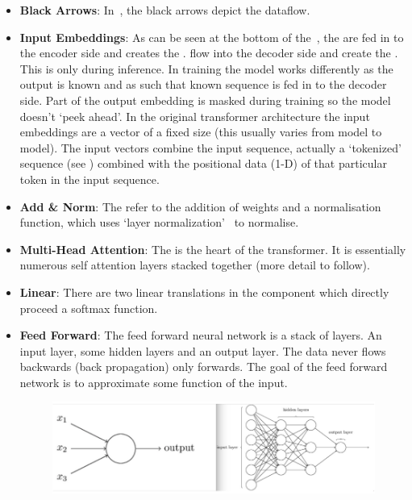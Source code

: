 \begin{itemize}
	\item \textbf{Black Arrows}: In~, the black arrows depict the dataflow.
	\item \textbf{Input Embeddings}: As can be seen at the bottom of the~, the  are fed in to the encoder side and creates the
	      .  flow into the decoder side and create the . This is only during inference. In training
	      the model works differently as the output is known and as such that known sequence is fed in to the decoder side. Part of the output embedding
	      is masked during training so the model doesn't `peek ahead'.
	      \bigbreak
	      In the original transformer architecture the input embeddings are a vector of a fixed size (this usually varies from model to model).
	      The input vectors combine the input sequence, actually a `tokenized' sequence (see ) combined with the positional data
	      (1-D) of that particular token in the input sequence.
	\item \textbf{Add \& Norm}: The  refer to the addition of weights and a normalisation function, which uses `layer normalization'~\autocite{vijayraniaDifferentNormalizationLayers2021} to normalise.
	\item \textbf{Multi-Head Attention}: The  is the heart of the transformer. It is essentially numerous self attention layers stacked together (more
	      detail to follow).
	\item\textbf{Linear}: There are two linear translations in the  component which directly proceed a softmax function.
	\item \textbf{Feed Forward}: The feed forward neural network is a stack of layers. An input layer, some hidden layers and an output layer.
	      The data never flows backwards (back propagation) only forwards. The goal of the feed forward network is to approximate some function of the input.
	      \begin{figure}[H]
		      \centering
		      \includegraphics[width=1\linewidth]{figures/feed_forward.png}

\end{figure}
\end{itemize}
